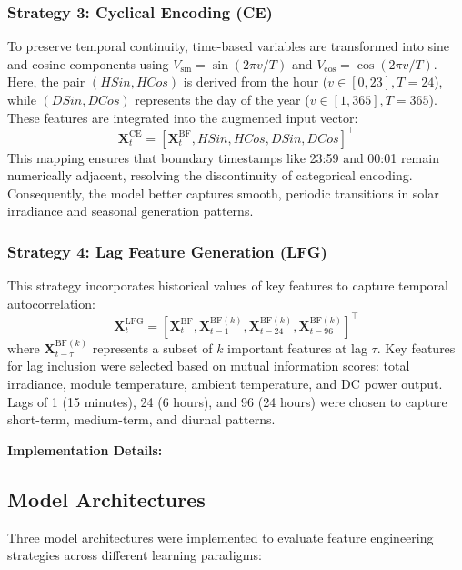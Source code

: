 \documentclass[conference]{IEEEtran}
\begin{document}
\subsubsection{Strategy 3: Cyclical Encoding (CE)}
To preserve temporal continuity, time-based variables are transformed into sine and cosine components using $V_{\sin} = \sin(2\pi v/T)$ and $V_{\cos} = \cos(2\pi v/T)$. Here, the pair $(HSin, HCos)$ is derived from the hour ($v \in [0, 23], T=24$), while $(DSin, DCos)$ represents the day of the year ($v \in [1, 365], T=365$). These features are integrated into the augmented input vector:\begin{equation}\mathbf{X}_t^{\text{CE}} = [\mathbf{X}_t^{\text{BF}}, HSin, HCos, DSin, DCos]^\top\end{equation}This mapping ensures that boundary timestamps like 23:59 and 00:01 remain numerically adjacent, resolving the discontinuity of categorical encoding. Consequently, the model better captures smooth, periodic transitions in solar irradiance and seasonal generation patterns.

\subsubsection{Strategy 4: Lag Feature Generation (LFG)}
This strategy incorporates historical values of key features to capture temporal autocorrelation:
\begin{equation}
\mathbf{X}_t^{\text{LFG}} = [\mathbf{X}_t^{\text{BF}}, \mathbf{X}_{t-1}^{\text{BF}(k)}, \mathbf{X}_{t-24}^{\text{BF}(k)}, \mathbf{X}_{t-96}^{\text{BF}(k)}]^\top
\end{equation}
where $\mathbf{X}_{t-\tau}^{\text{BF}(k)}$ represents a subset of $k$ important features at lag $\tau$. Key features for lag inclusion were selected based on mutual information scores: total irradiance, module temperature, ambient temperature, and DC power output. Lags of 1 (15 minutes), 24 (6 hours), and 96 (24 hours) were chosen to capture short-term, medium-term, and diurnal patterns.

\textbf{Implementation Details:}

\subsection{Model Architectures}
Three model architectures were implemented to evaluate feature engineering strategies across different learning paradigms:
\end{document}
